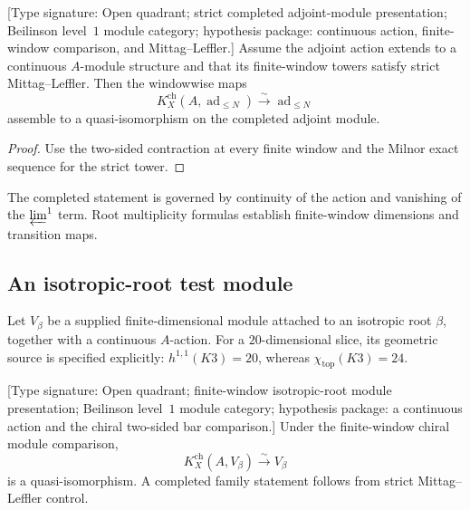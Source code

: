 \begin{theorem}
\label{thm:tbsp-theorem-B-adjoint}
\textup{[Type signature: Open quadrant; strict completed adjoint-module
presentation; Beilinson level~\(1\) module category; hypothesis package:
continuous action, finite-window comparison, and Mittag--Leffler.]}
Assume the adjoint action extends to a continuous \(A\)-module
structure and that its finite-window towers satisfy strict
Mittag--Leffler.  Then the windowwise maps
\begin{equation}\label{eq:tbsp-theorem-B-adjoint}
 K_X^{\mathrm{ch}}(A,\operatorname{ad}_{\leq N})
 \xrightarrow{\sim}\operatorname{ad}_{\leq N}
\end{equation}
assemble to a quasi-isomorphism on the completed adjoint module.
\end{theorem}

\begin{proof}
Use the two-sided contraction at every finite window and the Milnor
exact sequence for the strict tower.
\end{proof}

\begin{remark}
\label{rem:tbsp-adjoint-weight-completion}
The completed statement is governed by continuity of the action and
vanishing of the \(\varprojlim^1\) term.  Root multiplicity formulas
establish finite-window dimensions and transition maps.
\end{remark}

\subsection{An isotropic-root test module}
\label{subsec:tbsp-isotropic-imaginary-valpha}

\begin{definition}
\label{def:tbsp-vbeta-isotropic}
Let \(V_\beta\) be a supplied finite-dimensional module attached to
an isotropic root \(\beta\), together with a continuous \(A\)-action.
For a \(20\)-dimensional slice, its geometric source is specified
explicitly: \(h^{1,1}(K3)=20\), whereas
\(\chi_{\mathrm{top}}(K3)=24\).
\end{definition}

\begin{theorem}
\label{thm:tbsp-theorem-B-Vbeta}
\textup{[Type signature: Open quadrant; finite-window isotropic-root
module presentation; Beilinson level~\(1\) module category; hypothesis
package: a continuous action and the chiral two-sided bar comparison.]}
Under the finite-window chiral module comparison,
\begin{equation}\label{eq:tbsp-theorem-B-Vbeta}
 K_X^{\mathrm{ch}}(A,V_\beta)
 \xrightarrow{\sim}V_\beta
\end{equation}
is a quasi-isomorphism.  A completed family statement follows from
strict Mittag--Leffler control.
\end{theorem}


